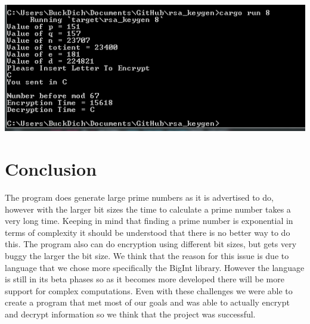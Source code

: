 \documentclass[12pt,journal,compsoc]{IEEEtran}
\begin{document}
\includegraphics[scale=0.6]{Capture.png}


\section{Conclusion}
The program does generate large prime numbers as it is advertised to do, however with the larger bit sizes the time to calculate a prime number takes a very long time. Keeping in mind that finding a prime number is exponential in terms of complexity it should be understood that there is no better way to do this. The program also can do encryption using different bit sizes, but gets very buggy the larger the bit size. We think that the reason for this issue is due to language that we chose more specifically the BigInt library. However the language is still in its beta phases so as it becomes more developed there will be more support for complex computations. Even with these challenges we were able to create a program that met most of our goals and was able to actually encrypt and decrypt information so we think that the project was successful. 
\end{document}
